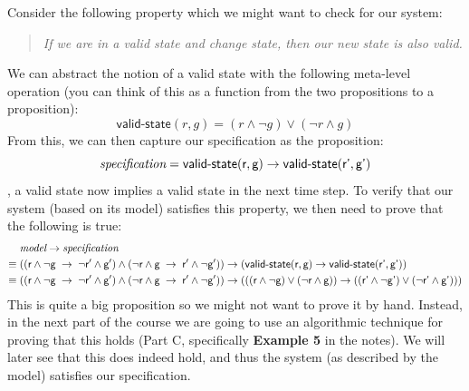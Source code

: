 Consider the following property which we might want to check
for our system:
%
\begin{quote}
\emph{If we are in a valid state and change state, then our new state
  is also valid.}
\end{quote}
%
We can abstract the notion of a valid state with the following
meta-level operation (you can think of this as a function from the
two propositions to a proposition):
%
\begin{equation*}
\textsf{valid-state}(r, g) = (r \wedge \neg g) \vee (\neg r \wedge g)
\end{equation*}
%
From this, we can then capture our specification as the proposition:
%
\begin{equation*}
  \textit{specification} = \textsf{valid-state}(\textsf{r}, \textsf{g})
  \rightarrow \textsf{valid-state}(\textsf{r'}, \textsf{g'})
\end{equation*}
%
\ie{}, a valid state now implies a valid state in the next time step.
To verify that our system (based on its model) satisfies this
property, we then need to prove that the following is true:
%
\begin{align*}
 & \textit{model} \rightarrow \textit{specification} \\
  \equiv \; &
((\textsf{r}{} \wedge \neg\textsf{g}{} \; \rightarrow \; \neg\textsf{r}{}' \wedge
\textsf{g}{}')
\wedge
(\neg\textsf{r}{} \wedge \textsf{g}{} \; \rightarrow \; \textsf{r}{}' \wedge
  \neg\textsf{g}{}'))
  \rightarrow
   (\textsf{valid-state}(\textsf{r}, \textsf{g})
           \rightarrow \textsf{valid-state}(\textsf{r'}, \textsf{g'})) \\
  \equiv \; &
((\textsf{r}{} \wedge \neg\textsf{g}{} \; \rightarrow \; \neg\textsf{r}{}' \wedge
\textsf{g}{}')
\wedge
(\neg\textsf{r}{} \wedge \textsf{g}{} \; \rightarrow \; \textsf{r}{}' \wedge
  \neg\textsf{g}{}'))
              \rightarrow
              (((\textsf{r} \wedge \neg \textsf{g}) \vee (\neg \textsf{r} \wedge \textsf{g}))
              \rightarrow ((\textsf{r'} \wedge \neg \textsf{g'}) \vee (\neg \textsf{r'} \wedge \textsf{g'})))
\end{align*}
%
This is quite a big proposition so we might not want to prove it by
hand. Instead, in the next part of the course we are going to use an
algorithmic technique for proving that this holds (Part C,
specifically \textbf{Example 5} in the notes). We will later see that
this does indeed hold, and thus the system (as described by the model)
satisfies our specification.

